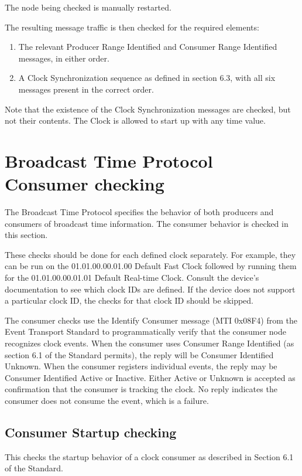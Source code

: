The node being checked is manually restarted.

The resulting message traffic is then checked for the required elements:
\begin{enumerate}
\item The relevant Producer Range Identified and Consumer Range Identified messages, in either order.
\item A Clock Synchronization sequence as defined in section 6.3,
      with all six messages present in the correct order.
\end{enumerate}

Note that the existence of the Clock Synchronization messages are checked, but not
their contents.  The Clock is allowed to start up with any time value.

\section{Broadcast Time Protocol Consumer checking}
\label{sec:consumer}

The Broadcast Time Protocol specifies the behavior of both producers and consumers of
broadcast time information.
The consumer behavior is checked in this section.

These checks should be done for each defined clock separately.
For example, they can be run on the 01.01.00.00.01.00 Default Fast Clock
followed by running them for the 01.01.00.00.01.01 Default Real-time Clock.
Consult the device's documentation to see which clock IDs are defined.
If the device does not support a particular clock ID, the checks for that clock ID
should be skipped.

The consumer checks use the Identify Consumer message (MTI 0x08F4) from the
Event Transport Standard to programmatically verify that the consumer node
recognizes clock events.  When the consumer uses Consumer Range Identified
(as section 6.1 of the Standard permits), the reply will be Consumer Identified
Unknown.  When the consumer registers individual events, the reply may be
Consumer Identified Active or Inactive.  Either Active or Unknown is accepted
as confirmation that the consumer is tracking the clock.  No reply indicates
the consumer does not consume the event, which is a failure.

\subsection{Consumer Startup checking}

This checks the startup behavior of a clock consumer as described in Section 6.1
of the Standard.

